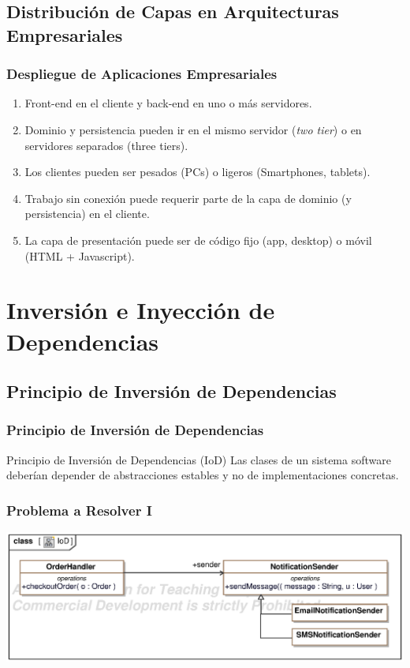 \documentclass[handout,a4paper,t,xcolor=pst,dvips,colortheme]{beamer}
\begin{document}
\subsection{Distribución de Capas en Arquitecturas Empresariales}

\begin{frame}[c]
	\frametitle{Despliegue de Aplicaciones Empresariales}
	\begin{enumerate}[<+->]
        \item Front-end en el cliente y back-end en uno o más servidores.
        \item Dominio y persistencia pueden ir en el mismo servidor (\emph{two tier}) o en servidores separados (three tiers).
        \item Los clientes pueden ser pesados (PCs) o ligeros (Smartphones, tablets).
        \item Trabajo sin conexión puede requerir parte de la capa de dominio (y persistencia) en el cliente.
        \item La capa de presentación puede ser de código fijo (app, desktop) o móvil (HTML + Javascript).
	\end{enumerate}
\end{frame}

\section{Inversión e Inyección de Dependencias}

\subsection{Principio de Inversión de Dependencias}

\begin{frame}[c]
	\frametitle{Principio de Inversión de Dependencias}
    \begin{block}{Principio de Inversión de Dependencias (IoD)}
        Las clases de un sistema software deberían depender de abstracciones estables y no de implementaciones concretas.
    \end{block}
\end{frame}

\begin{frame}[c]
	\frametitle{Problema a Resolver I}
	\begin{center}
        \includegraphics[width=\linewidth,keepaspectratio=true]{images/IoD/IoD.eps}
	\end{center}
\end{frame}
\end{document}
